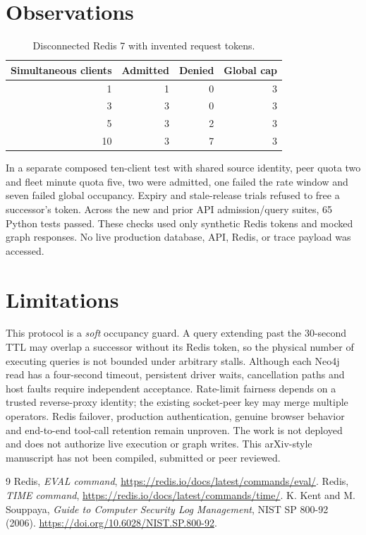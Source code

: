 \documentclass[11pt]{article}
\begin{document}
\section{Observations}
\begin{table}[h]\centering
\caption{Disconnected Redis 7 with invented request tokens.}
\begin{tabular}{rrrr}\toprule
Simultaneous clients & Admitted & Denied & Global cap\\\midrule
1&1&0&3\\
3&3&0&3\\
5&3&2&3\\
10&3&7&3\\\bottomrule
\end{tabular}
\end{table}
In a separate composed ten-client test with shared source identity,
peer quota two and fleet minute quota five, two were admitted,
one failed the rate window and seven failed global occupancy.
Expiry and stale-release trials refused to free a successor's token.
Across the new and prior API admission/query suites, 65 Python tests passed.
These checks used only synthetic Redis tokens and mocked graph responses.
No live production database, API, Redis, or trace payload was accessed.
\section{Limitations}
This protocol is a \emph{soft} occupancy guard. A query extending past the
30-second TTL may overlap a successor without its Redis token, so the
physical number of executing queries is not bounded under arbitrary stalls.
Although each Neo4j read has a four-second timeout, persistent driver waits,
cancellation paths and host faults require independent acceptance. Rate-limit
fairness depends on a trusted reverse-proxy identity; the existing socket-peer
key may merge multiple operators. Redis failover, production authentication,
genuine browser behavior and end-to-end tool-call retention remain unproven.
The work is not deployed and does not authorize live execution or graph writes.
This arXiv-style manuscript has not been compiled, submitted or peer reviewed.
\begin{thebibliography}{9}
 Redis, \emph{EVAL command}, \url{https://redis.io/docs/latest/commands/eval/}.
 Redis, \emph{TIME command}, \url{https://redis.io/docs/latest/commands/time/}.
 K. Kent and M. Souppaya, \emph{Guide to Computer Security Log Management},
NIST SP 800-92 (2006). \url{https://doi.org/10.6028/NIST.SP.800-92}.
\end{thebibliography}
\end{document}
